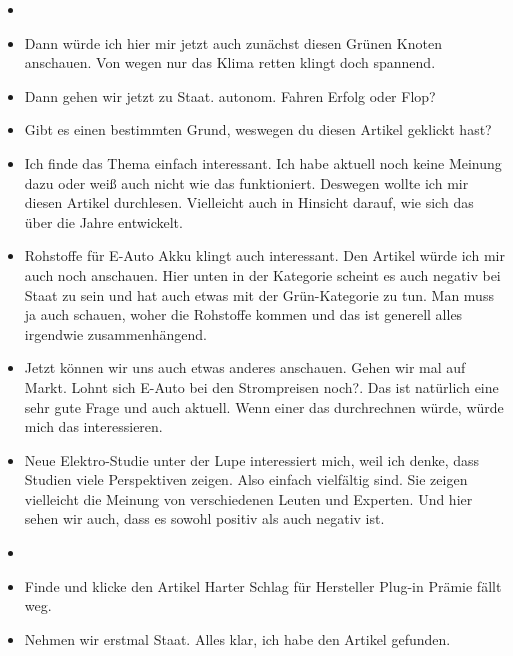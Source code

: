{\begin{itemize}[]
            \item {}
            \item {} Dann würde ich hier mir jetzt auch zunächst diesen Grünen Knoten anschauen.
                  \flqq Von wegen nur das Klima retten\frqq{} klingt doch spannend.
            \item {} Dann gehen wir jetzt zu Staat. \flqq autonom. Fahren Erfolg oder Flop?\frqq{}
            \item {} Gibt es einen bestimmten Grund, weswegen du diesen Artikel geklickt hast?
            \item {} Ich finde das Thema einfach interessant.
                  Ich habe aktuell noch keine Meinung dazu oder weiß auch nicht wie das funktioniert.
                  Deswegen wollte ich mir diesen Artikel durchlesen.
                  Vielleicht auch in Hinsicht darauf, wie sich das über die Jahre entwickelt.
            \item {} \flqq Rohstoffe für E-Auto Akku\frqq{} klingt auch interessant.
                  Den Artikel würde ich mir auch noch anschauen.
                  Hier unten in der Kategorie scheint es auch negativ bei Staat zu sein und hat auch etwas mit der Grün-Kategorie zu tun.
                  Man muss ja auch schauen, woher die Rohstoffe kommen und das ist generell alles irgendwie zusammenhängend.
            \item {} Jetzt können wir uns auch etwas anderes anschauen.
                  Gehen wir mal auf Markt.
                  \flqq Lohnt sich E-Auto bei den Strompreisen noch?\frqq{}.
                  Das ist natürlich eine sehr gute Frage und auch aktuell.
                  Wenn einer das durchrechnen würde, würde mich das interessieren.
            \item {} \flqq Neue Elektro-Studie unter der Lupe\frqq{} interessiert mich, weil ich denke, dass Studien viele Perspektiven zeigen.
                  Also einfach vielfältig sind.
                  Sie zeigen vielleicht die Meinung von verschiedenen Leuten und Experten.
                  Und hier sehen wir auch, dass es sowohl positiv als auch negativ ist.
            \item {}
            \item {} Finde und klicke den Artikel \flqq Harter Schlag für Hersteller Plug-in Prämie fällt weg\frqq{}.
            \item {} Nehmen wir erstmal Staat. Alles klar, ich habe den Artikel gefunden.

\end{itemize}}

